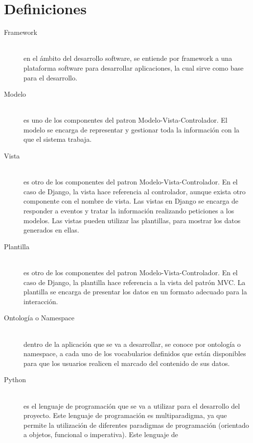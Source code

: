 \newpage

\section{Definiciones}

\begin{description}
    \item[Framework] \hfill \\
        en el ámbito del desarrollo software, se entiende por framework a una
        plataforma software para desarrollar aplicaciones, la cual sirve como
        base para el desarrollo.
    \item[Modelo] \hfill \\
        es uno de los componentes del patron Modelo-Vista-Controlador. El modelo
        se encarga de representar y gestionar toda la información con la que el
        sistema trabaja.
    \item[Vista] \hfill \\
        es otro de los componentes del patron Modelo-Vista-Controlador. En el
        caso de Django, la vista hace referencia al controlador, aunque exista
        otro componente con el nombre de vista. Las vistas en Django se encarga
        de responder a eventos y tratar la información realizando peticiones a
        los modelos. Las vistas pueden utilizar las plantillas, para mostrar los
        datos generados en ellas.
    \item[Plantilla] \hfill \\
        es otro de los componentes del patron Modelo-Vista-Controlador. En el
        caso de Django, la plantilla hace referencia a la vista del patrón MVC.
        La plantilla se encarga de presentar los datos en un formato adecuado
        para la interacción.
    \item[Ontología o Namespace] \hfill \\
        dentro de la aplicación que se va a desarrollar, se conoce por ontología
        o namespace, a cada uno de los vocabularios definidos que están
        disponibles para que los usuarios realicen el marcado del contenido de
        sus datos.
    \item[Python] \hfill \\
        \cite{python} es el lenguaje de programación que se va a utilizar para el desarrollo
        del proyecto. Este lenguaje de programación es multiparadigma, ya que
        permite la utilización de diferentes paradigmas de programación
        (orientado a objetos, funcional o imperativa). Este lenguaje de

\end{description}
